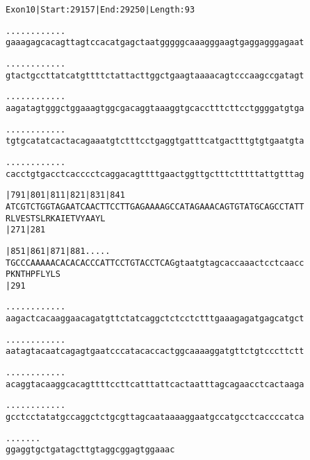 \documentclass{article}
\begin{document}
\begin{alltt}
Exon 10 | Start: 29157 | End: 29250 | Length: 93

.    .    .    .    .    .    .    .    .    .    .    .    
gaaagagcacagttagtccacatgagctaatgggggcaaagggaagtgaggagggagaat

.    .    .    .    .    .    .    .    .    .    .    .    
gtactgccttatcatgttttctattacttggctgaagtaaaacagtcccaagccgatagt

.    .    .    .    .    .    .    .    .    .    .    .    
aagatagtgggctggaaagtggcgacaggtaaaggtgcacctttcttcctggggatgtga

.    .    .    .    .    .    .    .    .    .    .    .    
tgtgcatatcactacagaaatgtctttcctgaggtgatttcatgactttgtgtgaatgta

.    .    .    .    .    .    .    .    .    .    .    .    
cacctgtgacctcacccctcaggacagttttgaactggttgctttctttttattgtttag

|791      |801      |811      |821      |831      |841      
ATCGTCTGGTAGAATCAACTTCCTTGAGAAAAGCCATAGAAACAGTGTATGCAGCCTATT
  R  L  V  E  S  T  S  L  R  K  A  I  E  T  V  Y  A  A  Y  L
                    |271                          |281      

|851      |861      |871      |881    .    .    .    .    . 
TGCCCAAAAACACACACCCATTCCTGTACCTCAGgtaatgtagcaccaaactcctcaacc
  P  K  N  T  H  P  F  L  Y  L  S                           
                    |291                                    

   .    .    .    .    .    .    .    .    .    .    .    . 
aagactcacaaggaacagatgttctatcaggctctcctctttgaaagagatgagcatgct

   .    .    .    .    .    .    .    .    .    .    .    . 
aatagtacaatcagagtgaatcccatacaccactggcaaaaggatgttctgtcccttctt

   .    .    .    .    .    .    .    .    .    .    .    . 
acaggtacaaggcacagttttccttcatttattcactaatttagcagaacctcactaaga

   .    .    .    .    .    .    .    .    .    .    .    . 
gcctcctatatgccaggctctgcgttagcaataaaaggaatgccatgcctcaccccatca

   .    .    .    .    .    .    .
ggaggtgctgatagcttgtaggcggagtggaaac
\end{alltt}
\newpage
\end{document}

